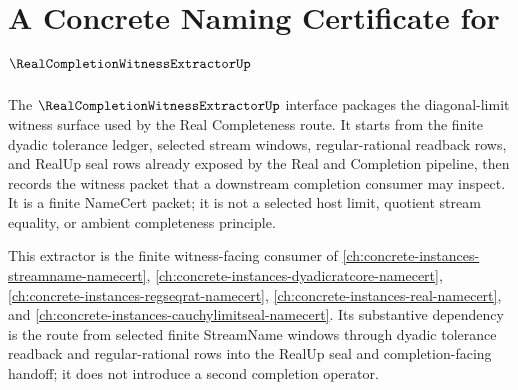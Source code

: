 \chapter{A Concrete Naming Certificate for $\RealCompletionWitnessExtractorUp$}
\label{ch:concrete-instances-realcompletionwitnessextractor-namecert}

The $\RealCompletionWitnessExtractorUp$ interface packages the diagonal-limit
witness surface used by the Real Completeness route. It starts from the
finite dyadic tolerance ledger, selected stream windows, regular-rational
readback rows, and RealUp seal rows already exposed by the Real and Completion
pipeline, then records the witness packet that a downstream completion
consumer may inspect. It is a finite NameCert packet; it is not a selected
host limit, quotient stream equality, or ambient completeness principle.

This extractor is the finite witness-facing consumer of
\autoref{ch:concrete-instances-streamname-namecert},
\autoref{ch:concrete-instances-dyadicratcore-namecert},
\autoref{ch:concrete-instances-regseqrat-namecert},
\autoref{ch:concrete-instances-real-namecert}, and
\autoref{ch:concrete-instances-cauchylimitseal-namecert}. Its substantive
dependency is the route from selected finite StreamName windows through
dyadic tolerance readback and regular-rational rows into the RealUp seal and
completion-facing handoff; it does not introduce a second completion
operator.


